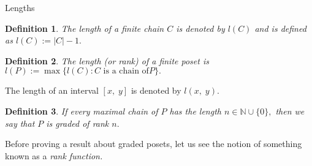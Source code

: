 \documentclass[handout, aspectratio=169]{beamer}
\newtheorem{defn}{Definition}
\begin{document}
\begin{frame}{Lengths}
	\begin{defn}
		The length of a finite chain $C$ is denoted by $l(C)$ and is defined as $l(C) := |C| - 1.$
	\end{defn}
	\begin{defn}
		The length (or rank) of a finite poset is $l(P) := \max\{l(C) : C\text{ is a chain of}P\}.$
	\end{defn}
	The length of an interval $[x,\;y]$ is denoted by $l(x,\;y).$
	\begin{defn}
		If every maximal chain of $P$ has the length $n \in \mathbb{N} \cup \{0\},$ then we say that $P$ is graded of rank $n.$
	\end{defn}
		Before proving a result about graded posets, let us see the notion of something known as a \emph{rank function.}
\end{frame}
\end{document}
